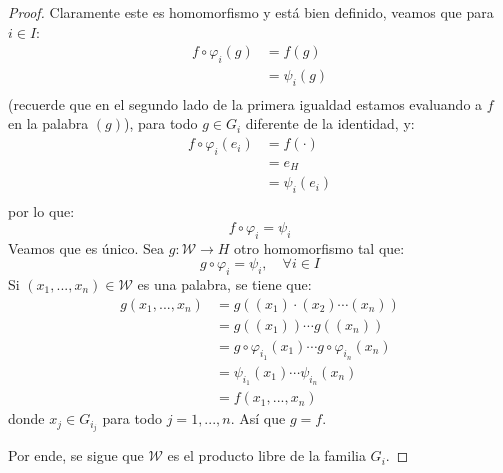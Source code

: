 \documentclass[12pt]{report}
\newcounter{it}
\theoremstyle{largebreak}
\newcommand\cf[3]{\ensuremath{#1:#2\rightarrow#3}}
\begin{document}
\begin{proof}
        Claramente este es homomorfismo y está bien definido, veamos que para $i\in I$:
        \begin{equation*}
            \begin{split}
                f\circ\varphi_i(g)&=f(g)\\
                &=\psi_i(g)\\
            \end{split}
        \end{equation*}
        (recuerde que en el segundo lado de la primera igualdad estamos evaluando a $f$ en la palabra $(g)$), para todo $g\in G_i$ diferente de la identidad, y:
        \begin{equation*}
            \begin{split}
                f\circ\varphi_i(e_i)&=f(\cdot)\\
                &=e_H\\
                &=\psi_i(e_i)\\
            \end{split}
        \end{equation*}
        por lo que:
        \begin{equation*}
            f\circ\varphi_i=\psi_i
        \end{equation*}
        Veamos que es único. Sea $\cf{g}{\mathscr{W}}{H}$ otro homomorfismo tal que:
        \begin{equation*}
            g\circ\varphi_i=\psi_i,\quad\forall i\in I
        \end{equation*}
        Si $(x_1,...,x_n)\in\mathscr{W}$ es una palabra, se tiene que:
        \begin{equation*}
            \begin{split}
                g(x_1,...,x_n)&=g((x_1)\cdot(x_2)\cdots(x_n))\\
                &=g((x_1))\cdots g((x_n))\\
                &=g\circ\varphi_{i_1}(x_1)\cdots g\circ\varphi_{i_n}(x_n)\\
                &=\psi_{ i_1}(x_1)\cdots\psi_{ i_n}(x_n)\\
                &=f(x_1,...,x_n)
            \end{split}
        \end{equation*}
        donde $x_j\in G_{ i_j}$ para todo $j=1,...,n$. Así que $g=f$.

        Por ende, se sigue que $\mathscr{W}$ es el producto libre de la familia $G_i$.
    \end{proof}
\end{document}
